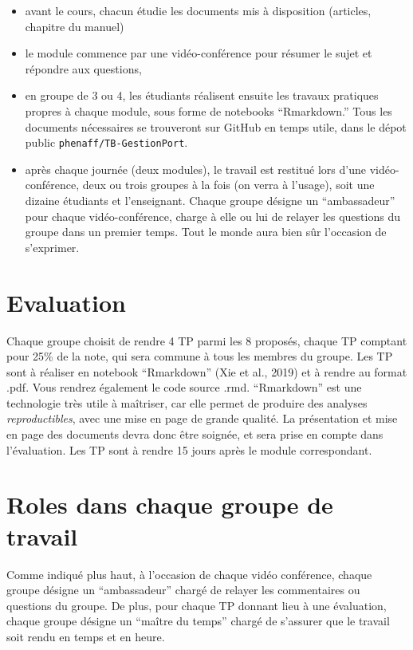 \documentclass[
  11pt,
]{article}
\begin{document}
\begin{itemize}
\item
  avant le cours, chacun étudie les documents mis à disposition
  (articles, chapitre du manuel)
\item
  le module commence par une vidéo-conférence pour résumer le sujet et
  répondre aux questions,
\item
  en groupe de 3 ou 4, les étudiants réalisent ensuite les travaux
  pratiques propres à chaque module, sous forme de notebooks
  ``Rmarkdown.'' Tous les documents nécessaires se trouveront sur GitHub
  en temps utile, dans le dépot public \texttt{phenaff/TB-GestionPort}.
\item
  après chaque journée (deux modules), le travail est restitué lors
  d'une vidéo-conférence, deux ou trois groupes à la fois (on verra à
  l'usage), soit une dizaine étudiants et l'enseignant. Chaque groupe
  désigne un ``ambassadeur'' pour chaque vidéo-conférence, charge à elle
  ou lui de relayer les questions du groupe dans un premier temps. Tout
  le monde aura bien sûr l'occasion de s'exprimer.
\end{itemize}

\hypertarget{evaluation}{%
\section{Evaluation}\label{evaluation}}

Chaque groupe choisit de rendre 4 TP parmi les 8 proposés, chaque TP
comptant pour 25\% de la note, qui sera commune à tous les membres du
groupe. Les TP sont à réaliser en notebook ``Rmarkdown'' (Xie et al.,
2019) et à rendre au format .pdf. Vous rendrez également le code source
.rmd. ``Rmarkdown'' est une technologie très utile à maîtriser, car elle
permet de produire des analyses \emph{reproductibles}, avec une mise en
page de grande qualité. La présentation et mise en page des documents
devra donc être soignée, et sera prise en compte dans l'évaluation. Les
TP sont à rendre 15 jours après le module correspondant.

\hypertarget{roles-dans-chaque-groupe-de-travail}{%
\section{Roles dans chaque groupe de
travail}\label{roles-dans-chaque-groupe-de-travail}}

Comme indiqué plus haut, à l'occasion de chaque vidéo conférence, chaque
groupe désigne un ``ambassadeur'' chargé de relayer les commentaires ou
questions du groupe. De plus, pour chaque TP donnant lieu à une
évaluation, chaque groupe désigne un ``maître du temps'' chargé de
s'assurer que le travail soit rendu en temps et en heure.
\end{document}
